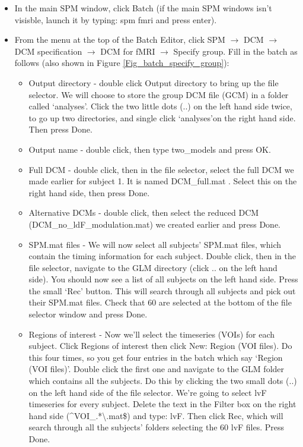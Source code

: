 \documentclass{article}
\begin{document}
\begin{itemize}

\item In the main SPM window, click Batch (if the main SPM windows isn't visisble, launch it by typing: spm fmri and press enter).

\item From the menu at the top of the Batch Editor, click SPM $\rightarrow$ DCM $\rightarrow$ DCM specification $\rightarrow$ DCM for fMRI $\rightarrow$ Specify group. Fill in the batch as follows (also shown in Figure \ref{Fig_batch_specify_group}):

\begin{itemize}
    

\item Output directory - double click Output directory to bring up the file selector. We will choose to store the group DCM file (GCM) in a folder called \lq analyses\rq. Click the two little dots (..) on the left hand side twice, to go up two directories, and single click \lq analyses\rq on the right hand side. Then press Done.

\item Output name - double click, then type two\_models and press OK.

\item Full DCM - double click, then in the file selector, select the full DCM we made earlier for subject 1. It is named DCM\_full.mat . Select this on the right hand side, then press Done.

\item Alternative DCMs - double click, then select the reduced DCM (DCM\_no\_ldF\_modulation.mat) we created earlier and press Done.

\item SPM.mat files - We will now select all subjects' SPM.mat files, which contain the timing information for each subject. Double click, then in the file selector, navigate to the GLM directory (click .. on the left hand side). You should now see a list of all subjects on the left hand side. Press the small `Rec' button. This will search through all subjects and pick out their SPM.mat files. Check that 60 are selected at the bottom of the file selector window and press Done.

\item Regions of interest - Now we'll select the timeseries (VOIs) for each subject. Click Regions of interest then click New: Region (VOI files). Do this four times, so you get four entries in the batch which say `Region (VOI files)'. Double click the first one and navigate to the GLM folder which contains all the subjects. Do this by clicking the two small dots (..) on the left hand side of the file selector. We're going to select lvF timeseries for every subject. Delete the text in the Filter box on the right hand side (\textasciicircum VOI\_.*\textbackslash.mat\$) and type: lvF. Then click Rec, which will search through all the subjects' folders selecting the 60 lvF files. Press Done.


\end{itemize}
\end{itemize}
\end{document}
